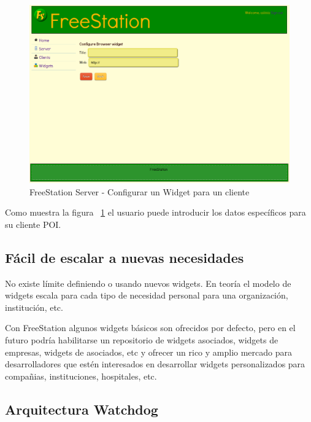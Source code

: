 \begin{figure}[ht]
    \begin{center}
        \includegraphics[scale=0.45]{src/img/freestation-server-configure-widget.png}
        \caption[FreeStation Server - Configurar un Widget para un cliente] {FreeStation
        Server - Configurar un Widget para un cliente}
        \label{fig:configurewidget}
    \end{center}
\end{figure}

Como muestra la figura ~\ref{fig:configurewidget} el usuario puede introducir
los datos específicos para su cliente POI.

\subsection{Fácil de escalar a nuevas necesidades}

No existe límite definiendo o usando nuevos widgets. En teoría el modelo de
widgets escala para cada tipo de necesidad personal para una organización,
institución, etc.

Con FreeStation algunos widgets básicos son ofrecidos por defecto, pero en el
futuro podría habilitarse un repositorio de widgets asociados, widgets de
empresas, widgets de asociados, etc y ofrecer un rico y amplio mercado para
desarrolladores que estén interesados en desarrollar widgets personalizados
para compañias, instituciones, hospitales, etc.

\newpage

\subsection{Arquitectura Watchdog}
\label{sec:watchdog}

